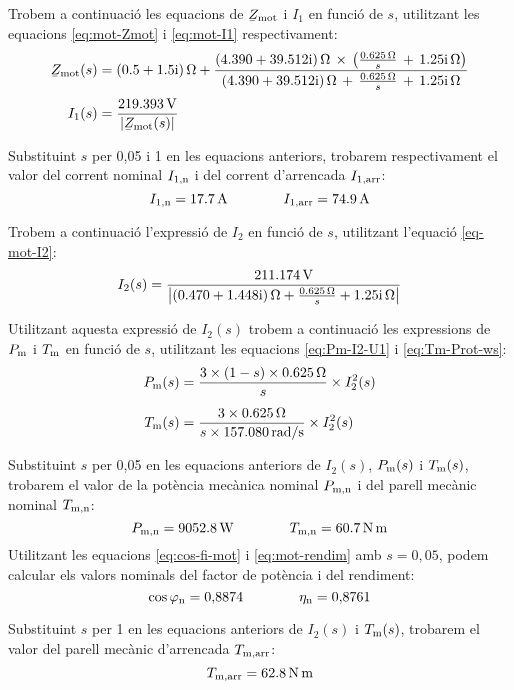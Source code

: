 \begin{exemple}
 Trobem a continuació les equacions de $\cmplx{Z}\ped{mot}$ i $I_1$ en funció de $s$, utilitzant les equacions \eqref{eq:mot-Zmot} i \eqref{eq:mot-I1} respectivament:
    \begin{align*}
		\cmplx{Z}\ped{mot}(s) &= \complexqty{0,5+j1,5}{\ohm} + \frac{\complexqty{4,390+j39,512}{\ohm}\,\times\,
	      \left(\tfrac{\qty{0,625}{\ohm}}{s}\, + \, \complexqty{j1,25}{\ohm}\right)}{\complexqty{4,390+j39,512}{\ohm}\,+\,
	   \tfrac{\qty{0,625}{\ohm}}{s}\, + \,\complexqty{j1,25}{\ohm}} \\[0.5ex]
   		I_1(s)  &= \frac{\qty{219,393}{V}}{|\cmplx{Z}\ped{mot}(s)|}  
	\end{align*} 
 
    Substituint $s$ per 0,05 i 1 en les equacions anteriors, trobarem respectivament el valor del corrent nominal $I_\mathrm{1,n}$ i del corrent d'arrencada $I_\mathrm{1,arr}$:
    \[
        I_\mathrm{1,n} = \qty{17,7}{A} \qquad\qquad
        I_\mathrm{1,arr} = \qty{74,9}{A}
    \]
    
    Trobem a continuació l'expressió de $I_2$ en funció de $s$, utilitzant l'equació \eqref{eq-mot-I2}:
    \[
        I_2(s) = \frac{\qty{211,174}{V}}{\left| \complexqty{0,470+j1,448}{\ohm} + \frac{\qty{0,625}{\ohm}}{s} + \complexqty{j1,25}{\ohm} \right|}
    \]

    Utilitzant aquesta expressió de $I_2(s)$ trobem a continuació les expressions de $P_\mathrm{m}$ i $T_\mathrm{m}$ en funció de $s$, utilitzant les equacions \eqref{eq:Pm-I2-U1} i \eqref{eq:Tm-Prot-ws}:
     \begin{align*}
        P_\mathrm{m}(s) &=\frac{ 3\times (1-s)\times \qty{0,625}{\ohm} }{s} \times  I_2^2(s) \\[1ex]
        T_\mathrm{m}(s)  &=  \frac{3\times \qty{0,625}{\ohm}}{s\times \qty{157,080}{rad/s}} \times  I_2^2(s)
    \end{align*}

     Substituint $s$ per 0,05  en les equacions anteriors de $I_2(s)$, $P_\mathrm{m}(s)$ i $T_\mathrm{m}(s)$, trobarem el valor de la potència mecànica nominal $P_\mathrm{m,n}$ i del parell mecànic nominal $T_\mathrm{m,n}$:
     \[
        P_\mathrm{m,n} = \qty{9052,8}{W} \qquad\qquad
         T_\mathrm{m,n} = \qty{60,7}{N.m} 
    \]   
    Utilitzant les equacions  \eqref{eq:cos-fi-mot} i \eqref{eq:mot-rendim} amb $s  = 0{,}05$, podem calcular els valors nominals del factor de potència i del rendiment:
    \[
    \cos\varphi_\mathrm{n} =  0{,}8874 \qquad\qquad
    \eta_\mathrm{n} =  0{,}8761
    \] 
    
    Substituint $s$ per 1   en les equacions anteriors de $I_2(s)$  i $T_\mathrm{m}(s)$, trobarem el valor del parell mecànic d'arrencada $T_\mathrm{m,arr}$:
	\[
		T_\mathrm{m,arr} = \qty{62,8}{N.m}
	\]


\end{exemple}

